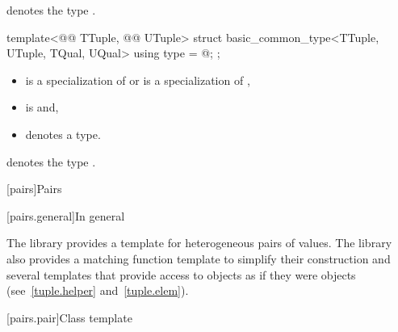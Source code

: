 \documentclass{wg21}
\begin{document}
\begin{addedblock}
\begin{itemdescr}
 denotes the type .

\end{itemdescr}

\begin{itemdecl}
template<@@ TTuple, @@ UTuple>
struct basic_common_type<TTuple, UTuple, TQual, UQual> {
    using type = @\seebelow@;
};
\end{itemdecl}

\begin{itemdescr}
\constraints
\begin{itemize}
    \item {} is a specialization of  or  is a specialization of ,
    \item {} is  and,
    \item {} denotes a type.
\end{itemize}

 denotes the type .

\end{itemdescr}
\end{addedblock}

[pairs]{Pairs}

[pairs.general]{In general}

\pnum
The library provides a template for heterogeneous pairs of values.
The library also provides a matching function template to simplify
their construction and several templates that provide access to 
objects as if they were  objects (see~\ref{tuple.helper}
and~\ref{tuple.elem}).%
%
%
%

[pairs.pair]{Class template }
\end{document}
